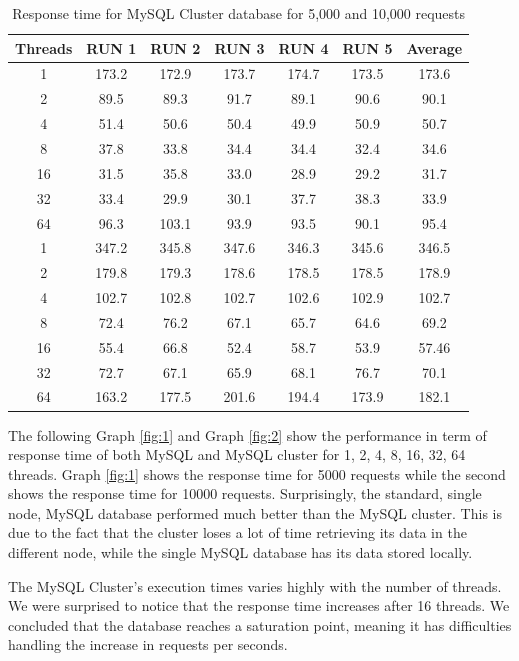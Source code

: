 \documentclass{article}
\begin{document}
\begin{table}[]
	\centering
	\caption{Response time for MySQL Cluster database for 5,000 and 10,000 requests}
	\label{my-label}
	\begin{tabular}{@{}ccccccc@{}}
		\toprule
		Threads & RUN 1    & RUN 2   & RUN 3   & RUN 4  & RUN 5  & Average      \\ \midrule\midrule
		1       & 173.2 & 172.9 & 173.7 & 174.7 & 173.5 & 173.6 \\
		2       & 89.5  & 89.3  & 91.7  & 89.1  & 90.6  & 90.1  \\
		4       & 51.4  & 50.6  & 50.4  & 49.9  & 50.9  & 50.7  \\
		8       & 37.8  & 33.8  & 34.4  & 34.4  & 32.4  & 34.6  \\
		16      & 31.5  & 35.8  & 33.0  & 28.9  & 29.2  & 31.7  \\
		32      & 33.4  & 29.9  & 30.1  & 37.7  & 38.3  & 33.9   \\
		64      & 96.3  & 103.1 & 93.9  & 93.5  & 90.1  & 95.4  \\\midrule
		1       & 347.2  & 345.8 & 347.6 & 346.3 & 345.6 & 346.5 \\
		2       & 179.8 & 179.3  & 178.6 & 178.5 & 178.5 & 178.9 \\
		4       & 102.7 & 102.8 & 102.7 & 102.6 & 102.9 & 102.7 \\
		8       & 72.4  & 76.2  & 67.1   & 65.7   & 64.6  & 69.2  \\
		16      & 55.4  & 66.8  & 52.4  & 58.7  & 53.9  & 57.46  \\
		32      & 72.7  & 67.1  & 65.9  & 68.1  & 76.7  & 70.1  \\
		64      & 163.2 & 177.5 & 201.6 & 194.4 & 173.9 & 182.1  \\ \bottomrule
	\end{tabular}
\end{table}


 The following Graph \ref{fig:1} and Graph \ref{fig:2} show the performance in term of response time of both MySQL and MySQL cluster for 1, 2, 4, 8, 16, 32, 64 threads. Graph \ref{fig:1} shows the response time for 5000 requests while the second shows the response time for 10000 requests. Surprisingly, the standard, single node, MySQL database performed much better than the MySQL cluster. This is due to the fact that the cluster loses a lot of time retrieving its data in the different node, while the single MySQL database has its data stored locally. 
 
 The MySQL Cluster's execution times varies highly with the number of threads. We were surprised to notice that the response time increases after 16 threads. We concluded that the database reaches a saturation point, meaning it has difficulties handling the increase in requests per seconds.
  
\end{document}
